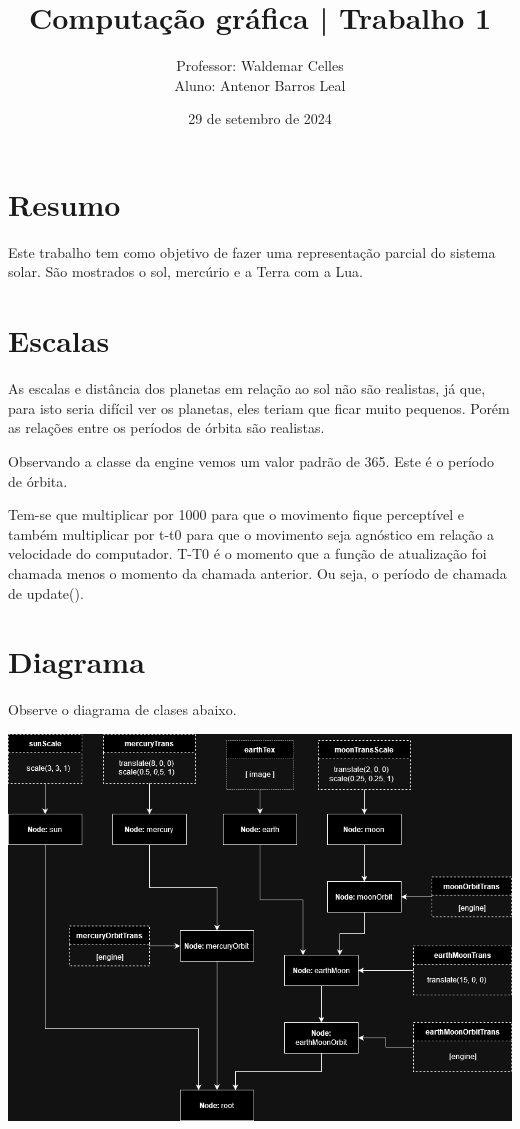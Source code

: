 \documentclass[11pt, a4paper]{article}
\title{Computação gráfica | Trabalho 1}
\author{Professor: Waldemar Celles\\
Aluno: Antenor Barros Leal}
\date{29 de setembro de 2024}
\begin{document}
\maketitle

\section {Resumo}
Este trabalho tem como objetivo de fazer uma representação parcial do sistema solar.
São mostrados o sol, mercúrio e a Terra com a Lua.

\section {Escalas}

As escalas e distância dos planetas em relação ao sol não são realistas, já que, para
isto seria difícil ver os planetas, eles teriam que ficar muito pequenos. Porém as
relações entre os períodos de órbita são realistas.

Observando a classe da engine vemos um valor padrão de 365. Este é o período de órbita.

Tem-se que multiplicar por 1000 para que o movimento fique perceptível e também multiplicar 
por t-t0 para que o movimento seja agnóstico em relação a velocidade do computador.
T-T0 é o momento que a função de atualização foi chamada menos o momento da chamada
anterior. Ou seja, o período de chamada de update().

\section{Diagrama}

Observe o diagrama de clases abaixo.

\includegraphics[width=0.8\linewidth]{Trab1Graph.png}
\end{document}

